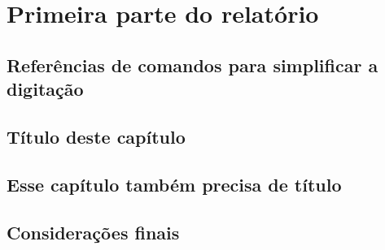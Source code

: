 \documentclass[pdftex,12pt,oneside,a4paper,english,french,spanish,brazil]{abntex2}
\begin{document}
\begin{sloppypar}
            \part{Primeira parte do relatório}\label{part:parte1}
          
            \chapter[Referências de comandos]{Referências de comandos para simplificar a digitação}\label{cap:refcomandos}
            

            \chapter{Título deste capítulo}\label{cap:capitulo1}
            
          
            \chapter{Esse capítulo também precisa de título}\label{cap:capitulo2}
            
          
            \chapter*[Considerações finais]{Considerações finais}\label{cap:consideracoesfinais}
            
          
            

          \postextual          
        
            \cleardoublepage
            
        



\end{sloppypar}
\end{document}
